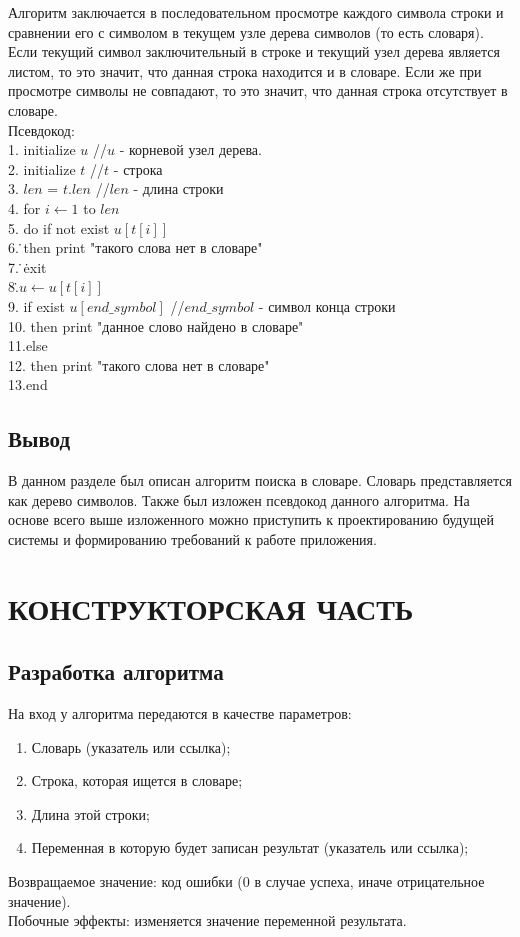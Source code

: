 \documentclass[a4paper,12pt]{article}
\begin{document}
Алгоритм заключается в последовательном просмотре каждого символа строки и сравнении его с символом в текущем узле дерева символов (то есть словаря). Если текущий символ заключительный в строке и текущий узел дерева является листом, то это значит, что данная строка находится и в словаре. Если же при просмотре символы не совпадают, то это значит, что данная строка отсутствует в словаре.\\
Псевдокод:\\
1. initialize $u$ \quad\quad //$u$ - корневой узел дерева.\\
2. initialize $t$ \quad\quad //$t$ - строка\\
3. $len$ = $t.len$ \quad\quad //$len$ - длина строки\\
4. for $i \leftarrow 1$ to $len$ \\
5. \quad do if not exist $u[t[i]]$\\
6. \quad\.\quad then print "такого слова нет в словаре"\\
7. \quad\.\quad\. exit\\
8.\.\quad $u \leftarrow u[t[i]]$\\
9. if exist $u[end\_symbol]$ \quad\quad //$end\_symbol$ - символ конца строки\\
10. \quad then print "данное слово найдено в словаре"\\
11.else \\
12. \quad then print "такого слова нет в словаре"\\
13.end \\

\newpage
\subsection{Вывод}
В данном разделе был описан алгоритм поиска в словаре. Словарь представляется как дерево символов. Также был изложен псевдокод данного алгоритма. На основе всего выше изложенного можно приступить к проектированию будущей системы и формированию требований к работе приложения.


\newpage
\section{КОНСТРУКТОРСКАЯ ЧАСТЬ}


\subsection{Разработка алгоритма}
На вход у алгоритма передаются в качестве параметров:
\begin{enumerate}
\item Словарь (указатель или ссылка);
\item Строка, которая ищется в словаре;
\item Длина этой строки;
\item Переменная в которую будет записан результат (указатель или ссылка);
\end{enumerate}
Возвращаемое значение: код ошибки (0 в случае успеха, иначе отрицательное значение). \\
Побочные эффекты: изменяется значение переменной результата.
\end{document}
